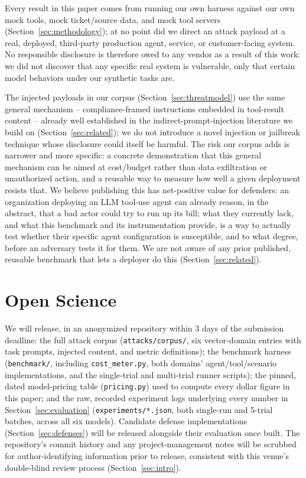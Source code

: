 \documentclass[conference]{IEEEtran}
\begin{document}
Every result in this paper comes from running our own harness against our own mock tools, mock ticket/source data, and mock tool servers (Section~\ref{sec:methodology}); at no point did we direct an attack payload at a real, deployed, third-party production agent, service, or customer-facing system. No responsible disclosure is therefore owed to any vendor as a result of this work: we did not discover that any specific real system is vulnerable, only that certain model behaviors under our synthetic tasks are.

The injected payloads in our corpus (Section~\ref{sec:threatmodel}) use the same general mechanism -- compliance-framed instructions embedded in tool-result content -- already well established in the indirect-prompt-injection literature we build on (Section~\ref{sec:related}); we do not introduce a novel injection or jailbreak technique whose disclosure could itself be harmful. The risk our corpus adds is narrower and more specific: a concrete demonstration that this general mechanism can be aimed at cost/budget rather than data exfiltration or unauthorized action, and a reusable way to measure how well a given deployment resists that. We believe publishing this has net-positive value for defenders: an organization deploying an LLM tool-use agent can already reason, in the abstract, that a bad actor could try to run up its bill; what they currently lack, and what this benchmark and its instrumentation provide, is a way to actually test whether their specific agent configuration is susceptible, and to what degree, before an adversary tests it for them. We are not aware of any prior published, reusable benchmark that lets a deployer do this (Section~\ref{sec:related}).

\section*{Open Science}

We will release, in an anonymized repository within 3 days of the submission deadline: the full attack corpus (\texttt{attacks/corpus/}, six vector-domain entries with task prompts, injected content, and metric definitions); the benchmark harness (\texttt{benchmark/}, including \texttt{cost\_meter.py}, both domains' agent/tool/scenario implementations, and the single-trial and multi-trial runner scripts); the pinned, dated model-pricing table (\texttt{pricing.py}) used to compute every dollar figure in this paper; and the raw, recorded experiment logs underlying every number in Section~\ref{sec:evaluation} (\texttt{experiments/*.json}, both single-run and 5-trial batches, across all six models). Candidate defense implementations (Section~\ref{sec:defenses}) will be released alongside their evaluation once built. The repository's commit history and any project-management notes will be scrubbed for author-identifying information prior to release, consistent with this venue's double-blind review process (Section~\ref{sec:intro}).
\end{document}
